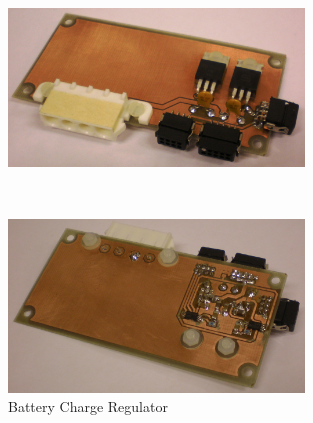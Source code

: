\begin{figure}[H]
\begin{minipage}[t]{\linewidth}
\centering
\includegraphics[width=0.7\textwidth]{figures/fig_SAR_top}
\end{minipage}
\\[1mm]
\begin{minipage}[t]{\linewidth}
\centering
\includegraphics[width=0.7\textwidth]{figures/fig_SAR_bottom}
\end{minipage}
\caption{Battery Charge Regulator}
\label{fig:SAR_top_bottom}
\end{figure}
%
